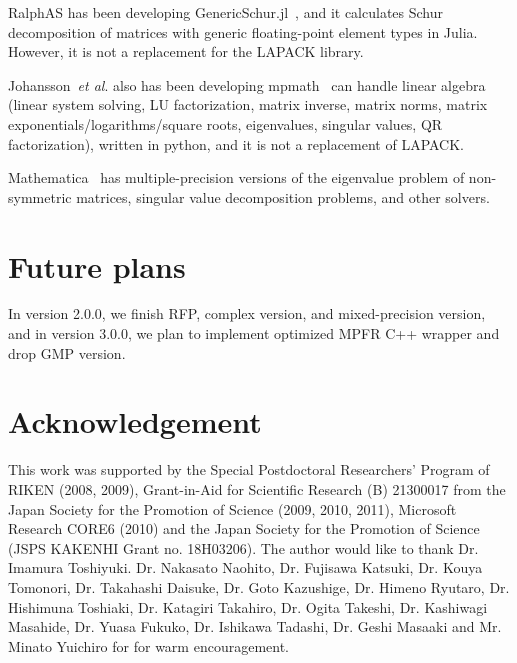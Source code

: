 \documentclass[12pt]{article}
\newcommand{\etal}{\textit{et al}.}
\begin{document}
RalphAS has been developing GenericSchur.jl~\cite{GenericSchur}, and it calculates Schur decomposition of matrices with generic floating-point element types in Julia. However, it is not a replacement for the LAPACK library.

Johansson~\etal{} also has been developing mpmath~\cite{mpmath} can handle linear algebra (linear system solving, LU factorization, matrix inverse, matrix norms, matrix exponentials/logarithms/square roots, eigenvalues, singular values, QR factorization), written in python, and it is not a replacement of LAPACK.

Mathematica~\cite{mathematica} has multiple-precision versions of the eigenvalue problem of non-symmetric matrices, singular value decomposition problems, and other solvers.

\section{Future plans}
\label{sec:futureplans}
In version 2.0.0, we finish RFP, complex version, and mixed-precision version, and in version 3.0.0, we plan to implement optimized MPFR C++ wrapper and drop GMP version.

\section*{Acknowledgement}
This work was supported by the Special Postdoctoral Researchers' Program of RIKEN (2008, 2009), Grant-in-Aid for Scientific Research (B) 21300017 from the Japan Society for the Promotion of Science (2009, 2010, 2011), Microsoft Research CORE6 (2010) and the Japan Society for the Promotion of Science (JSPS KAKENHI Grant no. 18H03206). 
The author would like to thank Dr. Imamura Toshiyuki. Dr. Nakasato Naohito, Dr. Fujisawa Katsuki, Dr. Kouya Tomonori, Dr. Takahashi Daisuke, Dr. Goto Kazushige, Dr. Himeno Ryutaro, Dr. Hishimuna Toshiaki, Dr. Katagiri Takahiro, Dr. Ogita Takeshi, Dr. Kashiwagi Masahide, Dr. Yuasa Fukuko, Dr. Ishikawa Tadashi, Dr. Geshi Masaaki and Mr. Minato Yuichiro for for warm encouragement.


\end{document}
